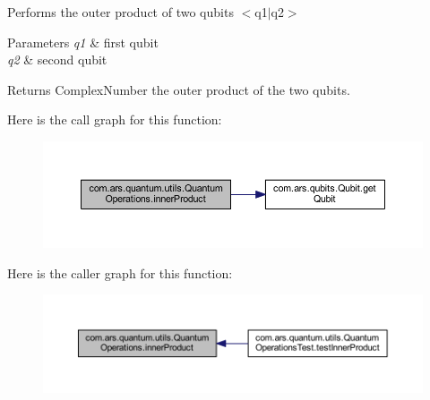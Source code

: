 Performs the outer product of two qubits $<$q1$\vert$q2$>$


\begin{DoxyParams}{Parameters}
{\em q1} & first qubit \\
\hline
{\em q2} & second qubit \\
\hline
\end{DoxyParams}
\begin{DoxyReturn}{Returns}
Complex\+Number the outer product of the two qubits. 
\end{DoxyReturn}
Here is the call graph for this function\+:
\nopagebreak
\begin{figure}[H]
\begin{center}
\leavevmode
\includegraphics[width=350pt]{classcom_1_1ars_1_1quantum_1_1utils_1_1_quantum_operations_a2343b850a5ad63b03644cdbd276d3bae_cgraph}
\end{center}
\end{figure}
Here is the caller graph for this function\+:
\nopagebreak
\begin{figure}[H]
\begin{center}
\leavevmode
\includegraphics[width=350pt]{classcom_1_1ars_1_1quantum_1_1utils_1_1_quantum_operations_a2343b850a5ad63b03644cdbd276d3bae_icgraph}
\end{center}
\end{figure}
\hypertarget{classcom_1_1ars_1_1quantum_1_1utils_1_1_quantum_operations_a2f1819a882498d91bec8d26658a7e080}{}\label{classcom_1_1ars_1_1quantum_1_1utils_1_1_quantum_operations_a2f1819a882498d91bec8d26658a7e080} 
